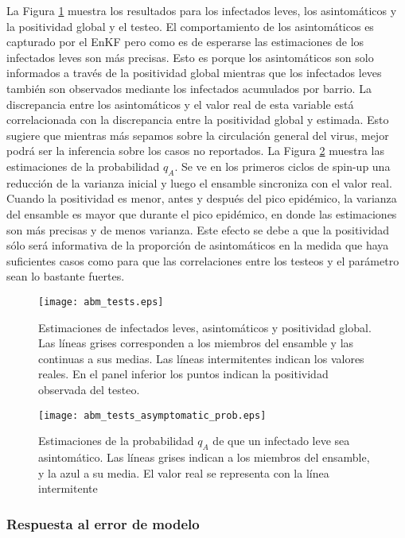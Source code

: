 La Figura \ref{fig:abm_tests} muestra los resultados para los infectados leves, los asintomáticos y la positividad global y el testeo. El comportamiento de los asintomáticos es capturado por el EnKF pero como es de esperarse las estimaciones de los infectados leves son más precisas. Esto es porque los asintomáticos son solo informados a través de la positividad global mientras que los infectados leves también son observados mediante los infectados acumulados por barrio. La discrepancia entre los asintomáticos y el valor real de esta variable está correlacionada con la discrepancia entre la positividad global y estimada. Esto sugiere que mientras más sepamos sobre la circulación general del virus, mejor podrá ser la inferencia sobre los casos no reportados. La Figura \ref{fig:abm_tests_asymptomatic_prob} muestra las estimaciones de la probabilidad $q_A$. Se ve en los primeros ciclos de spin-up una reducción de la varianza inicial y luego el ensamble sincroniza con el valor real. Cuando la positividad es menor, antes y después del pico epidémico, la varianza del ensamble es mayor que durante el pico epidémico, en donde las estimaciones son más precisas y de menos varianza. Este efecto se debe a que la positividad sólo será informativa de la proporción de asintomáticos en la medida que haya suficientes casos como para que las correlaciones entre los testeos y el parámetro sean lo bastante fuertes.
\begin{figure}[h]
    \centering
    \texttt{[image: abm\_tests.eps]}
    \caption{Estimaciones de infectados leves, asintomáticos y positividad global. Las líneas grises corresponden a los miembros del ensamble y las continuas a sus medias. Las líneas intermitentes indican los valores reales. En el panel inferior los puntos indican la positividad observada del testeo.}
    \label{fig:abm_tests}
\end{figure}
\begin{figure}[h]
    \centering
    \texttt{[image: abm\_tests\_asymptomatic\_prob.eps]}
    \caption{Estimaciones de la probabilidad $q_A$ de que un infectado leve sea asintomático. Las líneas grises indican a los miembros del ensamble, y la azul a su media. El valor real se representa con la línea intermitente}
    \label{fig:abm_tests_asymptomatic_prob}
\end{figure}

\subsubsection{Respuesta al error de modelo}

